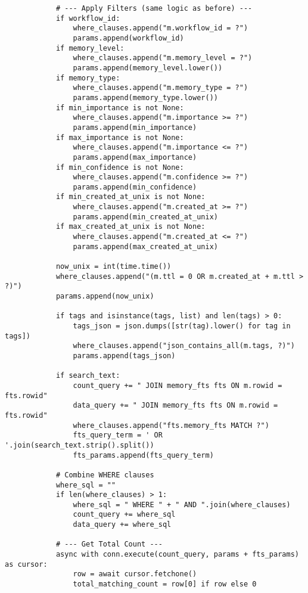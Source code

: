 \documentclass[12pt,a4paper]{article}
\begin{document}
\begin{pageablecode}
\begin{verbatim}
            # --- Apply Filters (same logic as before) ---
            if workflow_id:
                where_clauses.append("m.workflow_id = ?")
                params.append(workflow_id)
            if memory_level:
                where_clauses.append("m.memory_level = ?")
                params.append(memory_level.lower())
            if memory_type:
                where_clauses.append("m.memory_type = ?")
                params.append(memory_type.lower())
            if min_importance is not None:
                where_clauses.append("m.importance >= ?")
                params.append(min_importance)
            if max_importance is not None:
                where_clauses.append("m.importance <= ?")
                params.append(max_importance)
            if min_confidence is not None:
                where_clauses.append("m.confidence >= ?")
                params.append(min_confidence)
            if min_created_at_unix is not None:
                where_clauses.append("m.created_at >= ?")
                params.append(min_created_at_unix)
            if max_created_at_unix is not None:
                where_clauses.append("m.created_at <= ?")
                params.append(max_created_at_unix)

            now_unix = int(time.time())
            where_clauses.append("(m.ttl = 0 OR m.created_at + m.ttl > ?)")
            params.append(now_unix)

            if tags and isinstance(tags, list) and len(tags) > 0:
                tags_json = json.dumps([str(tag).lower() for tag in tags])
                where_clauses.append("json_contains_all(m.tags, ?)")
                params.append(tags_json)

            if search_text:
                count_query += " JOIN memory_fts fts ON m.rowid = fts.rowid"
                data_query += " JOIN memory_fts fts ON m.rowid = fts.rowid"
                where_clauses.append("fts.memory_fts MATCH ?")
                fts_query_term = ' OR '.join(search_text.strip().split())
                fts_params.append(fts_query_term)

            # Combine WHERE clauses
            where_sql = ""
            if len(where_clauses) > 1:
                where_sql = " WHERE " + " AND ".join(where_clauses)
                count_query += where_sql
                data_query += where_sql

            # --- Get Total Count ---
            async with conn.execute(count_query, params + fts_params) as cursor:
                row = await cursor.fetchone()
                total_matching_count = row[0] if row else 0


\end{verbatim}
\end{pageablecode}
\end{document}
